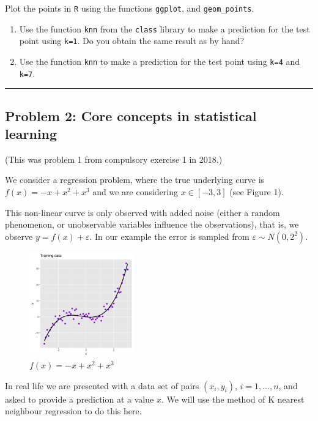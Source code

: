\documentclass[]{article}
\providecommand{\tightlist}{%
  \setlength{\itemsep}{0pt}\setlength{\parskip}{0pt}}
\begin{document}
Plot the points in \texttt{R} using the functions \texttt{ggplot}, and
\texttt{geom\_points}.

\begin{enumerate}
\def\labelenumi{\alph{enumi}.}
\setcounter{enumi}{5}
\tightlist
\item
  Use the function \texttt{knn} from the \texttt{class} library to make
  a prediction for the test point using \texttt{k=1}. Do you obtain the
  same result as by hand?
\item
  Use the function \texttt{knn} to make a prediction for the test point
  using \texttt{k=4} and \texttt{k=7}.
\end{enumerate}

\begin{center}\rule{0.5\linewidth}{\linethickness}\end{center}

\subsection{Problem 2: Core concepts in statistical
learning}\label{problem-2-core-concepts-in-statistical-learning}

(This was problem 1 from compulsory exercise 1 in 2018.)

We consider a regression problem, where the true underlying curve is
\(f(x)=-x+x^2+x^3\) and we are considering \(x \in [-3,3]\) (see Figure
1).

This non-linear curve is only observed with added noise (either a random
phenomenon, or unobservable variables influence the observations), that
is, we observe \(y=f(x)+\varepsilon\). In our example the error is
sampled from \(\varepsilon\sim N(0,2^2)\).

\begin{figure}
\centering
\includegraphics[width=0.40000\textwidth]{Prob1f1.png}
\caption{\(f(x)=-x+x^2+x^3\)}
\end{figure}

In real life we are presented with a data set of pairs \((x_i,y_i)\),
\(i=1,\ldots,n\), and asked to provide a prediction at a value \(x\). We
will use the method of K nearest neighbour regression to do this here.
\end{document}
